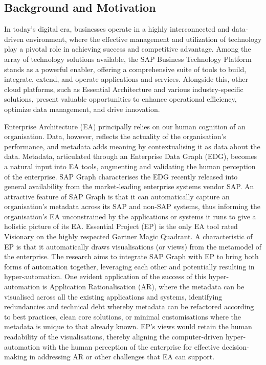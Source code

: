 \documentclass{article}
\begin{document}
\maketitle
\subsection{Background and Motivation}
In today's digital era, businesses operate in a highly interconnected and data-driven environment, where the effective management and utilization of technology play a pivotal role in achieving success and competitive advantage. Among the array of technology solutions available, the SAP Business Technology Platform stands as a powerful enabler, offering a comprehensive suite of tools to build, integrate, extend, and operate applications and services. Alongside this, other cloud platforms, such as Essential Architecture and various industry-specific solutions, present valuable opportunities to enhance operational efficiency, optimize data management, and drive innovation.

Enterprise Architecture (EA) principally relies on our human cognition of an organisation. Data, however, reflects the actuality of the organisation’s performance, and metadata adds meaning by contextualising it as data about the data. Metadata, articulated through an Enterprise Data Graph (EDG), becomes a natural input into EA tools, augmenting and validating the human perception of the enterprise. SAP Graph characterises the EDG recently released into general availability from the market-leading enterprise systems vendor SAP. An attractive feature of SAP Graph is that it can automatically capture an organisation’s metadata across its SAP and non-SAP systems, thus informing the organisation’s EA unconstrained by the applications or systems it runs to give a holistic picture of its EA. Essential Project (EP) is the only EA tool rated Visionary on the highly respected Gartner Magic Quadrant. A characteristic of EP is that it automatically draws visualisations (or views) from the metamodel of the enterprise. The research aims to integrate SAP Graph with EP to bring both forms of automation together, leveraging each other and potentially resulting in hyper-automation. One evident application of the success of this hyper-automation is Application Rationalisation (AR), where the metadata can be visualised across all the existing applications and systems, identifying redundancies and technical debt whereby metadata can be refactored according to best practices, clean core solutions, or minimal customisations where the metadata is unique to that already known. EP’s views would retain the human readability of the visualisations, thereby aligning the computer-driven hyper-automation with the human perception of the enterprise for effective decision-making in addressing AR or other challenges that EA can support.
\end{document}
